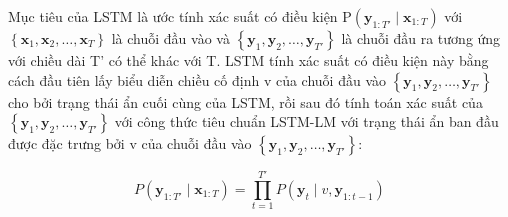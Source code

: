 Mục tiêu của LSTM là ước tính xác suất có điều kiện P$\left(\mathbf{y}_{1:T'} \mid \mathbf{x}_{1: T}\right)$ với $\left\{\mathbf{x}_{1}, \mathbf{x}_{2}, \ldots, \mathbf{x}_{T}\right\}$ là chuỗi đầu vào và $\left\{\mathbf{y}_{1}, \mathbf{y}_{2}, \ldots, \mathbf{y}_{T'}\right\}$ là chuỗi đầu ra tương ứng với chiều dài T' có thể khác với T. LSTM tính xác suất có điều kiện này bằng cách đầu tiên lấy biểu diễn chiều cố định v của chuỗi đầu vào $\left\{\mathbf{y}_{1}, \mathbf{y}_{2}, \ldots, \mathbf{y}_{T'}\right\}$ cho bởi trạng thái ẩn cuối cùng của LSTM, rồi sau đó tính toán xác suất của $\left\{\mathbf{y}_{1}, \mathbf{y}_{2}, \ldots, \mathbf{y}_{T'}\right\}$ với công thức tiêu chuẩn LSTM-LM với trạng thái ẩn ban đầu được đặc trưng bởi v của chuỗi đầu vào $\left\{\mathbf{y}_{1}, \mathbf{y}_{2}, \ldots, \mathbf{y}_{T'}\right\}$:

\begin{equation}
P\left(\mathbf{y}_{1:T'} \mid \mathbf{x}_{1:T}\right)=\prod_{t=1}^{T'} P\left(\mathbf{y}_{t} \mid v, \mathbf{y}_{1:t-1} \right)
\end{equation}
